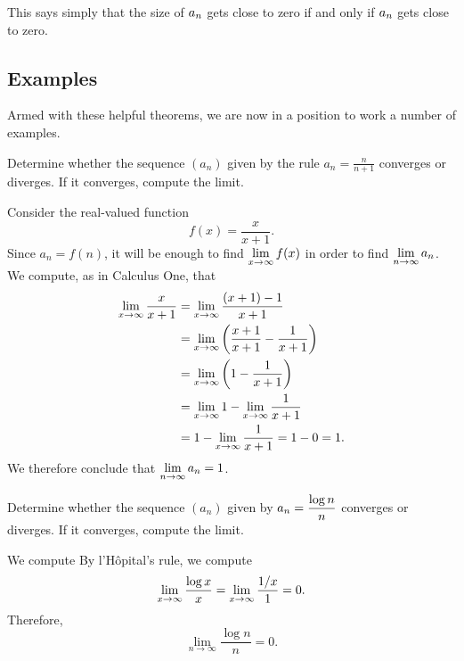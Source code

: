 This says simply that the size of $\displaystyle a_n$ gets close to zero if and
only if $\displaystyle a_n$ gets close to zero.

\subsection{Examples}

Armed with these helpful theorems, we are now in a position to work a
number of examples.

\begin{example}
Determine whether the sequence $(a_n)$ given by the rule $a_n = \frac{n}{n+1}$ converges or
diverges. If it converges, compute the limit.
\end{example}

\begin{solution}
Consider the real-valued function
$$
f(x) = \frac{x}{x+1}.
$$
Since $a_n = f(n)$, it will be enough to find $\displaystyle\lim_{x \to \infty} f(x)$ in order to find $\displaystyle\lim_{n \to \infty} a_n$.
We compute, as in Calculus One, that
\begin{align*}
\lim_{x\to\infty}{x\over x+1}
&= \lim_{x\to\infty} \frac{(x+1) - 1}{x+1} \\
&= \lim_{x\to\infty} \left( \frac{x+1}{x+1} - \frac{1}{x+1} \right) \\
&= \lim_{x\to\infty} \left( 1 - \frac{1}{x+1} \right) \\
&= \lim_{x\to\infty} 1 - \lim_{x \to \infty} \frac{1}{x+1} \\
&= 1 - \lim_{x \to \infty} \frac{1}{x+1} = 1 - 0 = 1. \\
\end{align*}
We therefore conclude that $\displaystyle\lim_{n \to \infty} a_n = 1$.
\end{solution}

\begin{example}
\label{example:log-n-over-n}
Determine whether the sequence $(a_n)$ given by $\displaystyle a_n = \frac{\log n}{n}$ converges or
diverges.  If it converges, compute the limit.
\end{example}

\begin{solution}
We compute
By l'H\^opital's rule, we compute
$$\lim_{x\to\infty}{\log x\over x}=\lim_{x\to\infty}{1/x\over 1}=
0.$$
Therefore, $$\lim_{n \to \infty}  \frac{\log n}{n} = 0.$$
\end{solution}

